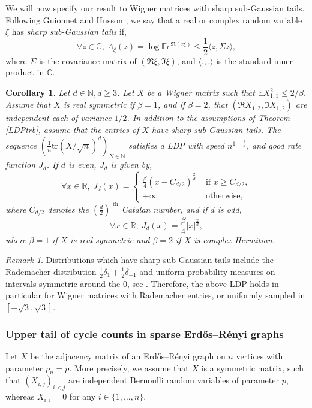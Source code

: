 \documentclass[aop,preprint]{imsart}
\newcommand\NN{\mathbb{N}}
\newcommand\RR{\mathbb{R}}
\newcommand\CC{\mathbb{C}}
\newcommand\EE{\mathbb{E}}
\newcommand\tr{\mathrm{tr}}
\numberwithin{equation}{section}
\theoremstyle{definition}
\theoremstyle{plain}
\newtheorem{Cor}[Def]{Corollary}
\theoremstyle{remark}
\newtheorem{Rem}[Def]{Remark}
\begin{document}
We will now specify our result to Wigner matrices with sharp sub-Gaussian tails. Following Guionnet and Husson \cite{GH}, we say that a real or complex random variable $\xi$ has \textit{sharp sub-Gaussian tails} if,
$$ \forall z \in \CC, \  \Lambda_{\xi}(z) = \log  \EE e^{\Re(z \xi)} \leq \frac{1}{2}\langle z, \Sigma z\rangle,$$
where $\Sigma$ is the covariance matrix of $(\Re \xi, \Im \xi)$, and $\langle . , . \rangle$ is the standard inner product in $\CC$.






\begin{Cor}\label{sharpsubGtr}
Let $d\in \NN, d\geq 3$.  Let $X$ be a Wigner matrix such that $\EE X_{1,1}^2 \leq 2/\beta$. Assume that $X$ is real symmetric if $\beta =1$, and if $\beta=2$, that $(\Re X_{1,2}, \Im X_{1,2})$ are independent each of variance $1/2$. In addition to the assumptions of Theorem \ref{LDPtrb}, assume that the entries of $X$ have sharp sub-Gaussian tails. 
The sequence $(\frac{1}{n}\tr(X/\sqrt{n})^d)_{N\in \NN}$
satisfies a LDP with speed $n^{1+\frac{2}{d}}$, and good rate function $J_d$.
If $d$ is even, $J_d$ is given by,
$$\forall x \in \RR, \ J_d(x) = \begin{cases}
\frac{\beta}{4} \left( x-C_{d/2}\right)^{\frac{2}{d}}& \text{ if } x\geq C_{d/2},\\
+\infty & \text{ otherwise,}
\end{cases}
$$
where $C_{d/2}$ denotes the $\left( \frac{d}{2}\right)^{\text{ th}}$ Catalan number, and if $d$ is odd, 
$$\forall x \in \RR, \ J_d(x) = \frac{\beta}{4}
\left| x\right|^{\frac{2}{d}},$$
where $\beta =1$ if $X$ is real symmetric and $\beta=2$ if $X$ is complex Hermitian.
\end{Cor}


\begin{Rem}
 Distributions which have sharp sub-Gaussian tails include the Rademacher distribution $\frac{1}{2} \delta_{1} + \frac{1}{2} \delta_{-1}$ and uniform probability measures on intervals symmetric around the $0$, see \cite[Examples 1.2]{GH}.
Therefore, the above LDP holds in particular for Wigner matrices with Rademacher entries, or uniformly sampled in $[-\sqrt{3},\sqrt{3}]$.



\end{Rem}
\subsubsection{Upper tail of cycle counts in sparse  Erd\H{o}s--R\'enyi graphs}
 Let $X$ be the adjacency matrix of an  Erd\H{o}s--R\'enyi graph on $n$ vertices with parameter $p_n=p$. More precisely, we assume that $X$ is a symmetric matrix, such that  $(X_{i,j})_{i<j}$ are independent Bernoulli random variables of parameter $p$, whereas $X_{i,i}=0$ for any $i\in \{1,\ldots,n\}$.
\end{document}
